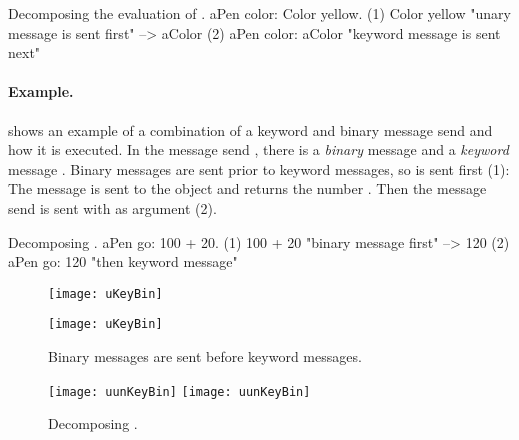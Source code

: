 \documentclass[a4paper,10pt,twoside]{book}
\begin{document}
\begin{example}[decColor]{Decomposing the evaluation of .}{}
        aPen color: Color yellow.
(1)                       Color yellow        "unary message is sent first"
                        --> aColor
(2)   aPen color: aColor                 "keyword message is sent next"
\end{example}

\paragraph{Example.}
 shows an example of a combination of a keyword and binary message send and how it is executed.
In the message send , there is a \emph{binary} message  and a \emph{keyword} message .
Binary messages are sent prior to keyword messages, so  is sent first (1):
The message  is sent to the object  and returns the number .
Then the message send  is sent with  as argument (2).

\begin{example}[decGo]{Decomposing .}{}
      aPen go: 100 + 20.
(1)                 100 + 20           "binary message first"
                   -->   120
(2)  aPen go: 120                   "then keyword message"
\end{example}

\begin{figure}[htb]
\begin{minipage}[t]{0.48\textwidth}
	\ifluluelse
		{\centerline{\texttt{[image: uKeyBin]}}}
		{\centerline{\texttt{[image: uKeyBin]}}}
	\caption{Binary messages are sent before keyword messages.\label{fig:uKeyBin}}
\end{minipage}
\hfill
\begin{minipage}[t]{0.48\textwidth}
	\begin{center}
	\ifluluelse
		{\texttt{[image: uunKeyBin]}}
		{\texttt{[image: uunKeyBin]}}
\caption{Decomposing .}\label{fig:unKeyBin}
\end{center}
\end{minipage}
\end{figure}

\end{document}
